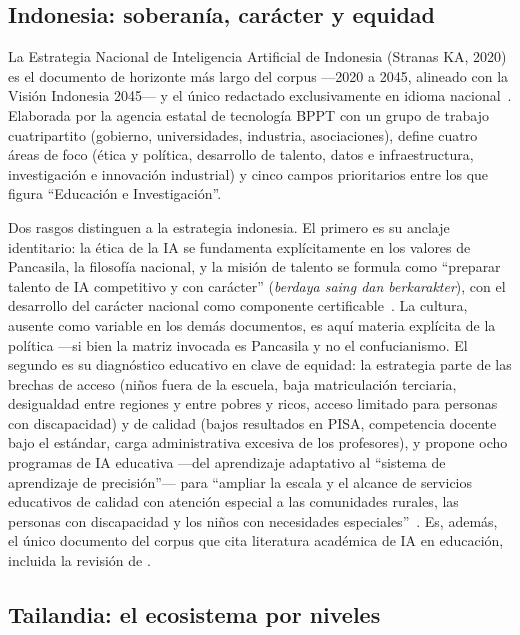 \subsection{Indonesia: soberanía, carácter y equidad}
\label{subsec:indonesia}

La Estrategia Nacional de Inteligencia Artificial de Indonesia (Stranas KA, 2020) es el documento de horizonte más largo del corpus —2020 a 2045, alineado con la Visión Indonesia 2045— y el único redactado exclusivamente en idioma nacional~\citep{indonesia2020stranas}. Elaborada por la agencia estatal de tecnología BPPT con un grupo de trabajo cuatripartito (gobierno, universidades, industria, asociaciones), define cuatro áreas de foco (ética y política, desarrollo de talento, datos e infraestructura, investigación e innovación industrial) y cinco campos prioritarios entre los que figura ``Educación e Investigación''.

Dos rasgos distinguen a la estrategia indonesia. El primero es su anclaje identitario: la ética de la IA se fundamenta explícitamente en los valores de Pancasila, la filosofía nacional, y la misión de talento se formula como ``preparar talento de IA competitivo y con carácter'' (\textit{berdaya saing dan berkarakter}), con el desarrollo del carácter nacional como componente certificable~\citep{indonesia2020stranas}. La cultura, ausente como variable en los demás documentos, es aquí materia explícita de la política —si bien la matriz invocada es Pancasila y no el confucianismo. El segundo es su diagnóstico educativo en clave de equidad: la estrategia parte de las brechas de acceso (niños fuera de la escuela, baja matriculación terciaria, desigualdad entre regiones y entre pobres y ricos, acceso limitado para personas con discapacidad) y de calidad (bajos resultados en PISA, competencia docente bajo el estándar, carga administrativa excesiva de los profesores), y propone ocho programas de IA educativa —del aprendizaje adaptativo al ``sistema de aprendizaje de precisión''— para ``ampliar la escala y el alcance de servicios educativos de calidad con atención especial a las comunidades rurales, las personas con discapacidad y los niños con necesidades especiales''~\citep{indonesia2020stranas}. Es, además, el único documento del corpus que cita literatura académica de IA en educación, incluida la revisión de \citet{zawacki2019systematic}.

\subsection{Tailandia: el ecosistema por niveles}
\label{subsec:tailandia}

